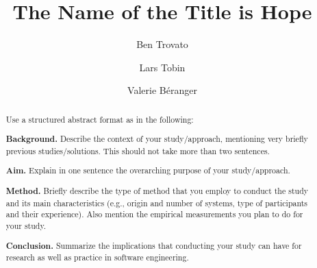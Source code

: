 \documentclass[sigconf,screen]{acmart}
\begin{document}
\title{The Name of the Title is Hope}

\author{Ben Trovato}

\author{Lars Tobin}


\author{Valerie B\'eranger}


\renewcommand{\shortauthors}{Trovato, Tobin, B\'eranger}

\begin{abstract}
  Use a structured abstract format as in the following:

\textbf{Background.} Describe the context of your study/approach, mentioning very briefly previous studies/solutions. This should not take more than two sentences.

\textbf{Aim.} Explain in one sentence the overarching purpose of your study/approach.

\textbf{Method.} Briefly describe the type of method that you employ to conduct the study and its main characteristics (e.g., origin and number of systems, type of participants and their experience). Also mention the empirical measurements you plan to do for your study.

\textbf{Conclusion.} Summarize the implications that conducting your study can have for research as well as practice in software engineering.
\end{abstract}



\maketitle
\end{document}
